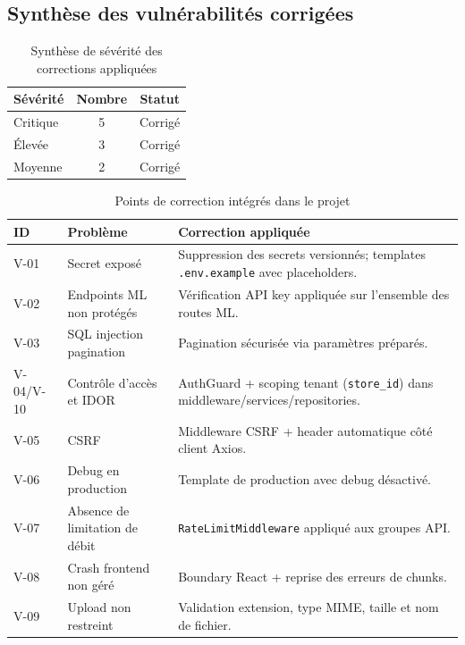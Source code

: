 \documentclass[12pt,a4paper]{report}
\begin{document}
\subsection{Synth\`{e}se des vuln\'{e}rabilit\'{e}s corrig\'{e}es}

\begin{table}[H]
\centering
\caption{Synth\`{e}se de s\'{e}v\'{e}rit\'{e} des corrections appliqu\'{e}es}
\label{tab:security_severity}
\begin{tabular}{lcc}
\toprule
\textbf{S\'{e}v\'{e}rit\'{e}} & \textbf{Nombre} & \textbf{Statut} \\
\midrule
Critique & 5 & Corrig\'{e} \\
\'{E}lev\'{e}e & 3 & Corrig\'{e} \\
Moyenne & 2 & Corrig\'{e} \\
\bottomrule
\end{tabular}
\end{table}

\begin{table}[H]
\centering
\caption{Points de correction int\'{e}gr\'{e}s dans le projet}
\label{tab:security_fixes_summary}
\begin{tabularx}{\textwidth}{>{\raggedright\arraybackslash}p{} >{\raggedright\arraybackslash}p{} >{\raggedright\arraybackslash}X}
\toprule
\textbf{ID} & \textbf{Probl\`{e}me} & \textbf{Correction appliqu\'{e}e} \\
\midrule
V-01 & Secret expos\'{e} & Suppression des secrets versionn\'{e}s; templates \texttt{.env.example} avec placeholders. \\
V-02 & Endpoints ML non prot\'{e}g\'{e}s & V\'{e}rification API key appliqu\'{e}e sur l'ensemble des routes ML. \\
V-03 & SQL injection pagination & Pagination s\'{e}curis\'{e}e via param\`{e}tres pr\'{e}par\'{e}s. \\
V-04/V-10 & Contr\^{o}le d'acc\`{e}s et IDOR & AuthGuard + scoping tenant (\texttt{store\_id}) dans middleware/services/repositories. \\
V-05 & CSRF & Middleware CSRF + header automatique c\^{o}t\'{e} client Axios. \\
V-06 & Debug en production & Template de production avec debug d\'{e}sactiv\'{e}. \\
V-07 & Absence de limitation de d\'{e}bit & \texttt{RateLimitMiddleware} appliqu\'{e} aux groupes API. \\
V-08 & Crash frontend non g\'{e}r\'{e} & Boundary React + reprise des erreurs de chunks. \\
V-09 & Upload non restreint & Validation extension, type MIME, taille et nom de fichier. \\
\bottomrule
\end{tabularx}
\end{table}
\end{document}

